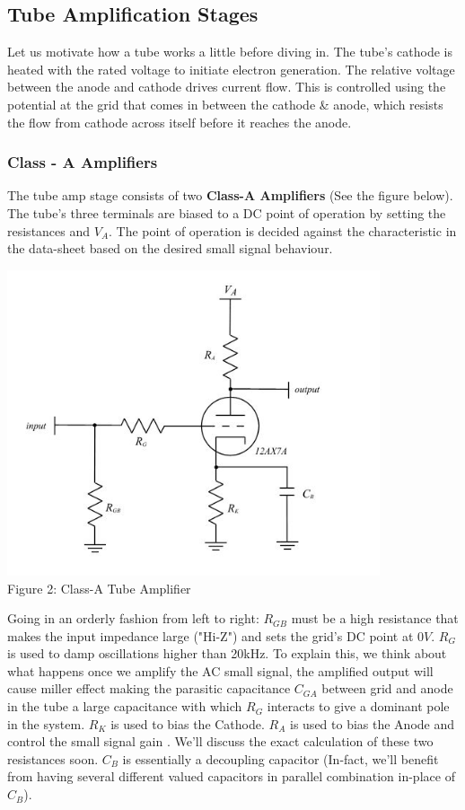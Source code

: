 \documentclass[11pt]{article}
\newcommand{\tab}{\hspace*{6mm}}
\begin{document}
\subsection{Tube Amplification Stages}
\tab Let us motivate how a tube works a little before diving in. The tube's cathode is heated with the rated voltage to initiate electron generation. The relative voltage between the anode and cathode drives current flow. This is controlled using the potential at the grid that comes in between the cathode \& anode, which resists the flow from cathode across itself before it reaches the anode.
\subsubsection{Class - A Amplifiers}
\tab The tube amp stage consists of two \textbf{Class-A Amplifiers} (See the figure below). The tube's three terminals are biased to a DC point of operation by setting the resistances and $V_A$. The point of operation is decided against the characteristic in the data-sheet based on the desired small signal behaviour.
\begin{center}\includegraphics[height=9cm]{class-a.png}\\\small{Figure 2: Class-A Tube Amplifier}\end{center}
\tab Going in an orderly fashion from left to right: $R_{GB}$ must be a high resistance that makes the input impedance large ("Hi-Z") and sets the grid's DC point at $0V$. $R_G$ is used to damp oscillations higher than 20kHz. To explain this, we think about what happens once we amplify the AC small signal, the amplified output will cause miller effect making the parasitic capacitance $C_{GA}$ between grid and anode in the tube a large capacitance with which $R_G$ interacts to give a dominant pole in the system. $R_K$ is used to bias the Cathode. $R_A$ is used to bias the Anode  and control the small signal gain . We'll discuss the exact calculation of these two resistances soon. $C_B$ is essentially a decoupling capacitor (In-fact, we'll benefit from having several different valued capacitors in parallel combination in-place of $C_B$).\\
\end{document}
